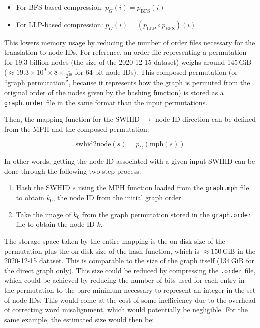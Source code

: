 \begin{itemize}
    \item For BFS-based compression: $p_G(i) = p_{\mathrm{BFS}}(i)$
    \item For LLP-based compression:
        $p_G(i) = (p_{\mathrm{LLP}} \circ p_{\mathrm{BFS}})(i)$
\end{itemize}

This lowers memory usage by reducing the number of order files necessary for
the translation to node IDs. For reference, an order file representing a
permutation for 19.3 billion nodes (the size of the 2020-12-15 dataset) weighs
around 145\,GiB ($\approx 19.3 \times 10^9 \times 8 \times \frac{1}{2^{30}}$
for 64-bit node IDs).
This composed permutation (or ``graph permutation'', because it represents how
the graph is permuted from the original order of the nodes given by the hashing
function) is stored as a \texttt{graph.order} file in the same format than the
input permutations.

Then, the mapping function for the \gls{SWHID} $\to$ node ID direction can be
defined from the \gls{MPH} and the composed permutation:

\[\mathrm{swhid2node}(s) = p_G(\mathrm{mph}(s))\]

In other words, getting the node ID associated with a given input SWHID can be
done through the following two-step process:

\begin{enumerate}
    \item Hash the SWHID $s$ using the \gls{MPH} function loaded from the
        \texttt{graph.mph} file to obtain $k_0$, the node ID from the initial
        graph order.
    \item Take the image of $k_0$ from the graph permutation stored in the
        \texttt{graph.order} file to obtain the node ID $k$.
\end{enumerate}

The storage space taken by the entire mapping is the on-disk size of the
permutation plus the on-disk size of the hash function, which is $\approx
150$\,GiB in the 2020-12-15 dataset. This is comparable to the size of the
graph itself (134\,GiB for the direct graph only). This size could be reduced
by compressing the \texttt{.order} file, which could be achieved by reducing
the number of bits used for each entry in the permutation to the bare minimum
necessary to represent an integer in the set of node IDs. This would come at
the cost of some inefficiency due to the overhead of correcting word
misalignment, which would potentially be negligible.
For the same example, the estimated size would then be:

